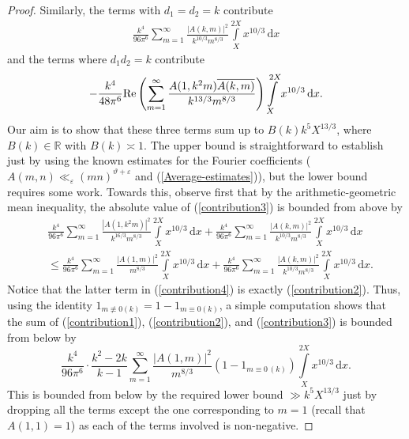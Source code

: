 \documentclass[a4paper,10pt,twoside]{amsart}
\theoremstyle{definition}
\numberwithin{equation}{section}
\newcommand\eps{\varepsilon}
\renewcommand{\Re}{\textnormal{Re}}
\renewcommand\:{\colon}
\begin{document}
\begin{proof}
Similarly, the terms with $d_1=d_2=k$ contribute
\begin{align}\label{contribution2}
\frac{k^4}{96\pi^6}\sum_{m=1}^\infty\frac{\left|A(k,m)\right|^2}{k^{10/3}m^{8/3}}\int\limits_X^{2X}x^{10/3}\,\mathrm d x
\end{align}
and the terms where $d_1d_2=k$ contribute
\begin{align}\label{contribution3}
-\frac{k^4}{48\pi^6}\Re\left(\sum_{m=1}^\infty\frac{A(1,k^2m)\overline{A(k,m)}}{k^{13/3}m^{8/3}}\right)\int\limits_X^{2X}x^{10/3}\,\mathrm d x. 
\end{align}
Our aim is to show that these three terms sum up to $B(k)k^5X^{13/3}$, where $B(k)\in\mathbb R$ with $B(k)\asymp 1$. The upper bound is straightforward to establish just by using the known estimates for the Fourier coefficients ($A(m,n)\ll_\eps (mn)^{\vartheta+\eps}$ and (\ref{Average-estimates})), but the lower bound requires some work. Towards this, observe first that by the arithmetic-geometric mean inequality, the absolute value of (\ref{contribution3}) is bounded from above by
\begin{align}\label{contribution4}
&\frac{k^4}{96\pi^6}\sum_{m=1}^\infty\frac{\left|A(1,k^2m)\right|^2}{k^{16/3}m^{8/3}}\int\limits_X^{2X}x^{10/3}\,\mathrm dx+\frac{k^4}{96\pi^6}\sum_{m=1}^\infty\frac{\left|A(k,m)\right|^2}{k^{10/3}m^{8/3}}\int\limits_X^{2X}x^{10/3}\,\mathrm d x \nonumber\\
&\leq\frac{k^4}{96\pi^6}\sum_{m=1}^\infty\frac{\left|A(1,m)\right|^2}{m^{8/3}}\int\limits_X^{2X}x^{10/3}\,\mathrm dx+\frac{k^4}{96\pi^6}\sum_{m=1}^\infty\frac{\left|A(k,m)\right|^2}{k^{10/3}m^{8/3}}\int\limits_X^{2X}x^{10/3}\,\mathrm d x.
\end{align}
Notice that the latter term in (\ref{contribution4}) is exactly (\ref{contribution2}). Thus, using the identity $1_{m\not\equiv 0(k)}=1-1_{m\equiv 0(k)}$, a simple computation shows that the sum of (\ref{contribution1}), (\ref{contribution2}), and (\ref{contribution3}) is bounded from below by 
\[\frac{k^4}{96\pi^6}\cdot\frac{k^2-2k}{k-1}\sum_{m=1}^\infty\frac{|A(1,m)|^2}{m^{8/3}}\left(1-1_{m\equiv 0\,(k)}\right)\int\limits_X^{2X}x^{10/3}\,\mathrm d x.\]
This is bounded from below by the required lower bound $\gg k^5X^{13/3}$ just by dropping all the terms except the one corresponding to $m=1$ (recall that $A(1,1)=1$) as each of the terms involved is non-negative.  


\end{proof}
\end{document}
